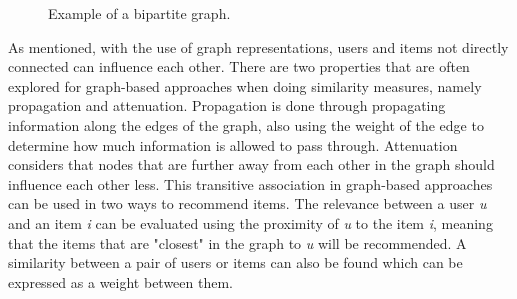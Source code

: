 \begin{figure}[h]
\caption{Example of a bipartite graph.}
\label{fig:bipartite-graph}
\end{figure}

As mentioned, with the use of graph representations, users and items not directly connected can influence each other.
There are two properties that are often explored for graph-based approaches when doing similarity measures, namely propagation and attenuation.
Propagation is done through propagating information along the edges of the graph, also using the weight of the edge to determine how much information is allowed to pass through.
Attenuation considers that nodes that are further away from each other in the graph should influence each other less.
This transitive association in graph-based approaches can be used in two ways to recommend items.
The relevance between a user \textit{u} and an item \textit{i} can be evaluated using the proximity of \textit{u} to the item \textit{i}, meaning that the items that are "closest" in the graph to \textit{u} will be recommended.
A similarity between a pair of users or items can also be found which can be expressed as a weight between them\cite{RecommenderHandbook2015}.

